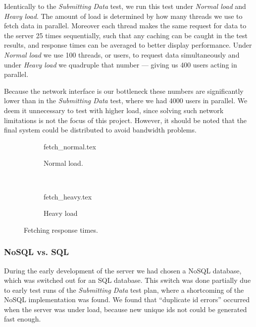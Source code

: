 Identically to the \textit{Submitting Data} test, we run this test under \textit{Normal load} and \textit{Heavy load}.
The amount of load is determined by how many threads we use to fetch data in parallel.
Moreover each thread makes the same request for data to the server 25 times sequentially, such that any caching can be caught in the test results, and response times can be averaged to better display performance.
Under \textit{Normal load} we use 100 threads, or users, to request data simultaneously and under \textit{Heavy load} we quadruple that number --- giving us 400 users acting in parallel.

Because the network interface is our bottleneck these numbers are significantly lower than in the \textit{Submitting Data} test, where we had 4000 users in parallel.
We deem it unnecessary to test with higher load, since solving such network limitations is not the focus of this project.
However, it should be noted that the final system could be distributed to avoid bandwidth problems.

\begin{figure}[!htb]
    \begin{subfigure}[b]{\textwidth}
        \footnotesize
        \centering
        {fetch_normal.tex}
        \caption{Normal load.}\label{fig:fetch_test_results_normal}
    \end{subfigure}\\
    \begin{subfigure}[b]{\textwidth}
        \footnotesize
        \centering
        {fetch_heavy.tex}
        \caption{Heavy load}\label{fig:fetch_test_results_heavy}
    \end{subfigure}
    \caption{Fetching response times.}\label{fig:fetch_test_results}
\end{figure}

\subsubsection*{NoSQL vs. SQL}\label{subsec:nosql_vs._sql}
During the early development of the server we had chosen a NoSQL database, which was switched out for an SQL database.
This switch was done partially due to early test runs of the \textit{Submitting Data} test plan, where a shortcoming of the NoSQL implementation was found.
We found that \enquote{duplicate id errors} occurred when the server was under load, because new unique ids not could be generated fast enough.

